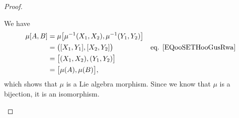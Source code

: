 \begin{proof}
\begin{subproof}
		We have
		\begin{subequations}
			\begin{align}
				\mu[A,B] & =\mu\big[   \mu^{-1}(X_1,X_2),\mu^{-1}(Y_1,Y_2) \big]                                       \\
				         & = \big( [X_1,Y_1],[X_2,Y_2] \big)                     & \text{eq. \eqref{EQooSETHooGusRwa}} \\
				         & = \big[  (X_1,X_2),(Y_1,Y_2) \big]                                                          \\
				         & =\big[  \mu(A),\mu(B) \big],
			\end{align}
		\end{subequations}
		which shows that \( \mu\) is a Lie algebra morphism. Since we know that \( \mu\) is a bijection, it is an isomorphism.
	\end{subproof}
\end{proof}
